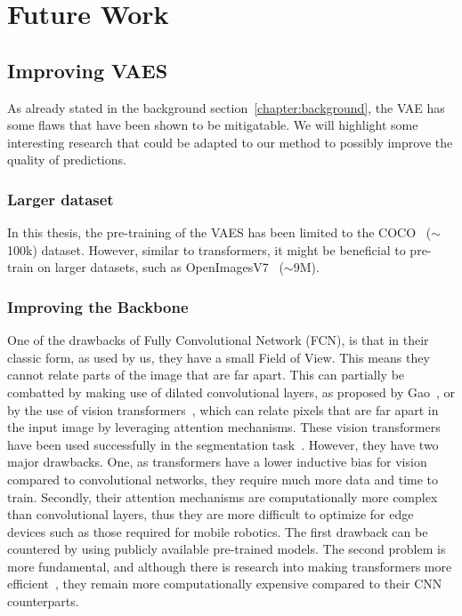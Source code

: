 \chapter{Future Work}\label{chapter:future_work}

\section{Improving VAES}
As already stated in the background section~\ref{chapter:background}, the VAE has some flaws that have been shown to be mitigatable. We will highlight some interesting research that could be adapted to our method to possibly improve the quality of predictions.
\subsection{Larger dataset}
In this thesis, the pre-training of the VAES has been limited to the COCO~\cite{lin2015microsoftcococommonobjects} ($\sim$100k) dataset. However, similar to transformers, it might be beneficial to pre-train on larger datasets, such as OpenImagesV7~\cite{OpenImages} ($\sim$9M).

\subsection{Improving the Backbone}
One of the drawbacks of Fully Convolutional Network (FCN), is that in their classic form, as used by us, they have a small Field of View. This means they cannot relate parts of the image that are far apart. This can partially be combatted by making use of dilated convolutional layers, as proposed by Gao~\cite{gao2023rethinking}, or by the use of vision transformers~\cite{dosovitskiy2021image}, which can relate pixels that are far apart in the input image by leveraging attention mechanisms. These vision transformers have been used successfully in the segmentation task~\cite{xie2021segformer,chen2022vision}. However, they have two major drawbacks. One, as transformers have a lower inductive bias for vision~\cite{dosovitskiy2021image} compared to convolutional networks, they require much more data and time to train. Secondly, their attention mechanisms are computationally more complex than convolutional layers, thus they are more difficult to optimize for edge devices such as those required for mobile robotics. The first drawback can be countered by using publicly available pre-trained models. The second problem is more fundamental, and although there is research into making transformers more efficient~\cite{li2022efficientformer,Yu2021MetaFormerIA}, they remain more computationally expensive compared to their CNN counterparts.

